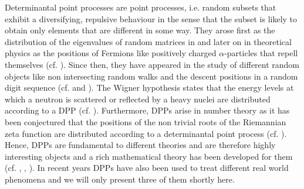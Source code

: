 Determinantal point processes are point processes, i.e. random subsets that exhibit a diversifying, repulsive behaviour in the sense that the subset is likely to obtain only elements that are different in some way. They arose first as the distribution of the eigenvalues of random matrices in \cite{mehta1960density} and later on in theoretical physics as the positions of Fermions like positively charged \(\alpha\)-particles that repell themselves (cf. \cite{benard1973detection}). Since then, they have appeared in the study of different random objects like non intersecting random walks and the descent positions in a random digit sequence (cf. \cite{johansson2004determinantal} and \cite{borodin2010adding}). The Wigner hypothesis states that the energy levels at which a neutron is scattered or reflected by a heavy nuclei are distributed according to a DPP (cf. \cite{tao2010universality}). Furthermore, DPPs arise in number theory as it has been conjectured that the positions of the non trivial roots of the Riemannian zeta function are distributed according to a determinantal point process (cf. \cite{bourgade2013quantum}). Hence, DPPs are fundamental to different theories and are therefore highly interesting objects and a rich mathematical theory has been developed for them (cf. \cite{borodin2009determinantal}, \cite{hough2006determinantal}, \cite{lyons2003determinantal}).
In recent years DPPs have also been used to treat different real world phenomena and we will only present three of them shortly here.
